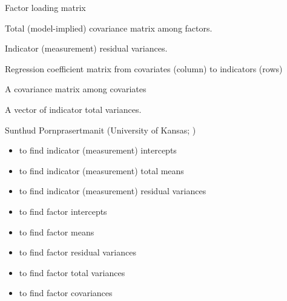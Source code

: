 \documentclass[a4paper]{book}
\begin{document}
\begin{Arguments}
\begin{ldescription}
\item[\code{lambda}] 
Factor loading matrix

\item[\code{totalFactorCov}] 
Total (model-implied) covariance matrix among factors. 

\item[\code{residualVarTheta}] 
Indicator (measurement) residual variances. 

\item[\code{kappa}] 
Regression coefficient matrix from covariates (column) to indicators (rows)

\item[\code{covcov}] 
A covariance matrix among covariates

\end{ldescription}
\end{Arguments}
%
\begin{Value}
A vector of indicator total variances.
\end{Value}
%
\begin{Author}\relax
Sunthud Pornprasertmanit (University of Kansas; )
\end{Author}
%
\begin{SeeAlso}\relax
\begin{itemize}

\item {} to find indicator (measurement) intercepts
\item {} to find indicator (measurement) total means
\item {} to find indicator (measurement) residual variances
\item {} to find factor intercepts
\item {} to find factor means
\item {} to find factor residual variances
\item {} to find factor total variances
\item {} to find factor covariances

\end{itemize}

\end{SeeAlso}
\end{document}
